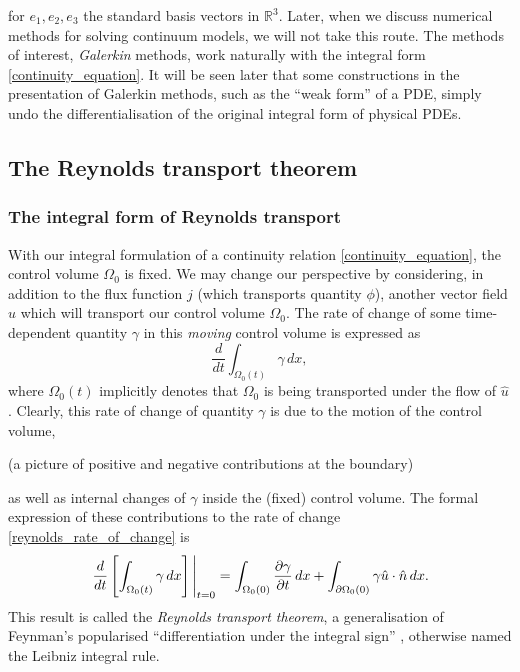 \documentclass[11pt,a4paper]{memoir}
\newcommand{\Part}[2]{\frac{\partial #1}{\partial #2}}
\begin{document}
for $e_1,e_2,e_3$ the standard basis vectors in $\mathbb{R}^3$.
Later, when we discuss numerical methods for solving continuum models, we will not take this route. The methods of interest, \textit{Galerkin} methods,
work naturally with the integral form \eqref{continuity_equation}.
It will be seen later that some constructions in the presentation of Galerkin methods, such as the ``weak form'' of a PDE, simply undo the differentialisation of the original integral form of physical PDEs.

\subsection{The Reynolds transport theorem}
\subsubsection{The integral form of Reynolds transport}
With our integral formulation of a continuity relation \eqref{continuity_equation}, the control volume $\Omega_0$ is fixed.
We may change our perspective by considering, in addition to the flux function $j$ (which transports quantity $\phi$), another
vector field $\hat{u}$ which will transport our control volume $\Omega_0$. The rate of change of some time-dependent quantity $\gamma$ in this
\textit{moving} control volume is expressed as
\begin{equation}\label{reynolds_rate_of_change}
    \frac{d}{dt}\int_{\Omega_0(t)}\gamma\,dx,
\end{equation}
where $\Omega_0(t)$ implicitly denotes that $\Omega_0$ is being transported under the flow of $\hat{u}$.
Clearly, this rate of change of quantity $\gamma$ is due to the motion of the control volume,

\vskip 0.2in
(a picture of positive and negative contributions at the boundary)
\vskip 0.2in

as well as internal changes of $\gamma$ inside the (fixed) control volume.
The formal expression of these contributions to the rate of change \eqref{reynolds_rate_of_change} is
\begin{equation}\label{reynolds_transport_theorem}
    \eval{\frac{d}{dt}\left[\int_{\Omega_0(t)}\gamma\,dx\right]}_{t=0} =
        \int_{\Omega_0(0)}\Part{\gamma}{t}\,dx + \int_{\partial\Omega_0(0)}\gamma \hat{u}\cdot\hat{n} \,dx.
\end{equation}
This result is called the \textit{Reynolds transport theorem},
a generalisation of Feynman's popularised ``differentiation under the integral sign'' \cite{feynman_trick},
otherwise named the Leibniz integral rule.
\end{document}
